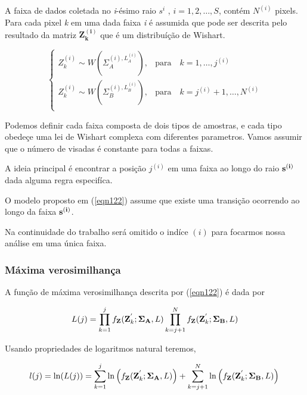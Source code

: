 A faixa de dados coletada no {\it i}-ésimo raio {\bf $s^{i}$} , $i=1,2,\dots, S$, contém $N^{(i)}$ pixels. Para cada pixel {\it k} em uma dada faixa {\it i} é assumida que pode ser descrita pelo resultado da matriz $\mathbf{Z_{k}^{(i)}}$ que é um distribuíção de Wishart.  


\begin{equation}\label{eqn122}
 \left\{
\begin{array}{cl}
	Z_{k}^{(i)}\sim W(\Sigma_{A}^{(i),L_{A}^{(i)}}),& \mbox{para}\quad k=1,\dots,j^{(i)}  \\
	Z_{k}^{(i)}\sim W(\Sigma_{B}^{(i),L_{B}^{(i)}}),& \mbox{para}\quad k=j^{(i)} + 1,\dots,N^{(i)}  \\
\end{array}
\right.
\end{equation}

Podemos definir cada faixa composta de dois tipos de amostras, e cada tipo obedeçe uma lei de Wishart complexa com diferentes parametros. Vamos assumir que o número de visadas é constante para todas a faixas.

A ideia principal é encontrar a posição $j^{(i)}$ em uma faixa ao longo do raio ${\bf s^{(i)}}$ dada alguma regra especifíca.

O modelo proposto em (\ref{eqn122}) assume que existe uma transição ocorrendo ao longo da faixa $\bf s^{(i)}$. 

Na continuidade do trabalho será omitido o indíce $(i)$ para focarmos nossa análise em uma única faixa.

\subsubsection{Máxima verosimilhança}

A função de máxima verosimilhança descrita por (\ref{eqn122}) é dada por

\begin{equation*}
	L(j)=\prod_{k=1}^{j}f_{\mathbf{Z}}(\mathbf{Z}_{k}^{'};\mathbf{\Sigma_{A}},L) \prod_{k=j+1}^{N}f_{\mathbf{Z}}(\mathbf{Z}_{k}^{'};\mathbf{\Sigma_{B}},L) \\
\end{equation*}

Usando propriedades de logaritmos natural teremos,


\begin{equation}\label{eqn123}
	l(j)=\ln(L(j))=\sum_{k=1}^{j}\ln\left(f_{\mathbf{Z}}(\mathbf{Z}_{k}^{'};\mathbf{\Sigma_{A}},L)\right)+ \sum_{k=j+1}^{N}\ln\left(f_{\mathbf{Z}}(\mathbf{Z}_{k}^{'};\mathbf{\Sigma_{B}},L)\right) \\
\end{equation}

